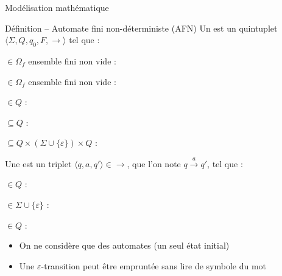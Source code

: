 
\begingroup

\begin{frame}{Modélisation mathématique}

  \begin{block}{Définition -- Automate fini non-déterministe (AFN)}
    \vspace{1mm}
    Un  est un quintuplet \alert{$\langle \Sigma, Q, q_0, F, \rightarrow \rangle$} tel que :
    \begin{description}[xxxxx]
    \item[\alert{$\Sigma$}] $\in \Omega_f$ ensemble fini non vide : 
    \item[\alert{$Q$}]  $\in \Omega_f$ ensemble fini non vide : 
    \item[\alert{$q_0$}] $\in Q$ : 
    \item[\alert{$F$}] $\subseteq Q$ : 
    \item[\alert{$\rightarrow$}] $\subseteq  Q \times (\Sigma \cup \{\varepsilon\}) \times Q$ : 
    \end{description}

    \vspace{1mm}
    Une  est un triplet \alert{$\langle q, a, q' \rangle \in \rightarrow$}, que l'on note \alert{$q\xrightarrow{a} q'$}, tel que :
    \begin{description}[xxxxx]
    \item[\alert{$q$}] $\in Q$ : 
    \item[\alert{$a$}] $\in \Sigma \cup \{\varepsilon\}$ : 
    \item[\alert{$q'$}] $\in Q$ : 
    \end{description}
    
    \vspace{1mm}
    \begin{itemize}
    \item On ne considère que des automates  (un seul état initial)
    \item Une $\varepsilon$-transition peut être empruntée sans lire de symbole du mot
    \end{itemize}
  \end{block}
  
  
\end{frame}

\endgroup
\endinput
